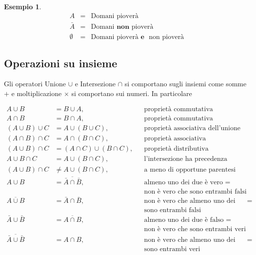 \documentclass[
  11pt,
]{book}
\theoremstyle{mytheoremstyle}
\theoremstyle{mydefstyle}
\newtheorem{example}{{Esempio}}[section]
\newenvironment{nota}
  {
\begin{tcolorbox}[enhanced,breakable,arc=0.1mm,boxrule=1pt,colback=white,colframe=iblue,title=\bf \fontfamily{lmss}\selectfont \faInfoCircle \hspace{.5 cm} Nota,drop fuzzy shadow]
}{
\end{tcolorbox}
  }
\begin{document}
\begin{example}
\begin{eqnarray*}
    A&=&  \text{Domani pioverà}\\
    \bar A&=&  \text{Domani }\textbf{non}\text{ pioverà}\\
    \emptyset &=& \text{Domani pioverà }\textbf{e }\text{ non pioverà}
\end{eqnarray*}
\end{example}

\subsection{Operazioni su insieme}\label{operazioni-su-insieme}

\begin{nota}

Gli operatori Unione \(\cup\) e Intersezione \(\cap\) si comportano sugli
insiemi come somme \(+\) e moltiplicazione \(\times\) si comportano sui
numeri. In particolare

\begin{align*}
  A\cup B &=  B\cup A ,&&\text{proprietà commutativa dell'unione}\\
  A\cap B &=  B\cap A ,&&\text{proprietà commutativa dell'intersezione}\\
  (A\cup B)\cup C &=   A\cup (B\cup C),       &&\text{proprietà associativa dell'unione}\\
  (A\cap B)\cap C &=   A\cap (B\cap C),       &&\text{proprietà associativa dell'intersezione}\\
  (A\cup B)\cap C &=  (A\cap C)\cup(B\cap C), &&\text{proprietà distributiva dell'intersezione}\\
  A\cup B\cap C   &=   A\cup (B\cap C),       &&\text{l'intersezione ha precedenza sull'unione}\\ 
  (A\cup B)\cap C &\ne A\cup (B\cap C),       &&\text{a meno di opportune parentesi}\\
  A\cup B &= \overline{\bar A\cap\bar B},     &&\text{almeno uno dei due è vero $=$}\\
  &&& \text{non è vero che sono entrambi falsi}\\
  \overline{A\cup B} &= \bar A \cap \bar B,   &&\text{non è vero che almeno uno dei due è vero $=$}\\
  &&& \text{sono entrambi falsi}\\ 
  \bar A\cup \bar B &= \overline{ A\cap B},   &&\text{almeno uno dei due è falso $=$}\\
  &&& \text{non è vero che sono entrambi veri}\\
  \overline{ \bar A\cup \bar B} &= A\cap B,   &&\text{non è vero che almeno uno dei due è falso $=$}\\
  &&& \text{sono entrambi veri}\\
\end{align*}

\end{nota}
\end{document}
